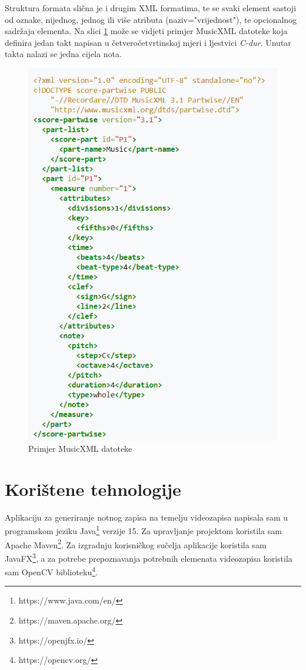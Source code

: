 \documentclass[times, utf8, zavrsni, numeric]{fer}
\begin{document}
Struktura formata slična je i drugim XML formatima, te se svaki element sastoji od oznake, nijednog, jednog ili više atributa (naziv="vrijednost"), te opcionalnog sadržaja elementa. Na slici \ref{fig:musicxml} može se vidjeti primjer MusicXML datoteke koja definira jedan takt napisan u četveročetvrtinskoj mjeri i ljestvici \textit{C-dur}. Unutar takta nalazi se jedna cijela nota.

\begin{figure}[h]
	\includegraphics[scale=0.65]{musicxml.png}
	\centering
	\caption{Primjer MusicXML datoteke\cite{musicxml}}
	\label{fig:musicxml}
\end{figure}

\chapter{Korištene tehnologije}
Aplikaciju za generiranje notnog zapisa na temelju videozapisa napisala sam u programskom jeziku Java\footnote{https://www.java.com/en/} verzije 15. Za upravljanje projektom koristila sam Apache Maven\footnote{https://maven.apache.org/}. Za izgradnju korisničkog sučelja aplikacije koristila sam JavaFX\footnote{https://openjfx.io/}, a za potrebe prepoznavanja potrebnih elemenata videozapisa koristila sam OpenCV biblioteku\footnote{https://opencv.org/}.
\end{document}
